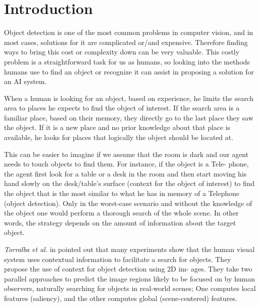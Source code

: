 \chapter{Introduction}
\label{Introduction.ch}
 Object detection is one of the most common problems in computer vision, and in
most cases, solutions for it are complicated or/and expensive. Therefore finding
ways to bring this cost or complexity down can be very valuable. This costly
problem is a straightforward task for us as humans, so looking into the methods
humans use to find an object or recognize it can assist in proposing a solution
for an AI system.
 
When a human is looking for an object, based on experience, he limits the
search area to places he expects to find the object of interest. If the search
area is a familiar place, based on their memory, they directly go to the last place
they saw the object. If it is a new place and no prior knowledge about that place
is available, he looks for places that logically the object should be located at.

This can be easier to imagine if we assume that the room is dark and our
agent needs to touch objects to find them. For instance, if the object is a Tele-
phone, the agent first look for a table or a desk in the room and then start
moving his hand slowly on the desk/table's surface (context for the object of
interest) to find the object that is the most similar to what he has in memory of
a Telephone (object detection). Only in the worst-case scenario and without the
knowledge of the object one would perform a thorough search of the whole
scene. In other words, the strategy depends on the amount of information about
the target object.



{\it Torralba et al.} in \cite{eyeMovement} pointed out that many experiments show
that the human visual system uses contextual information to facilitate a search
for objects. They propose the use of context for object detection using 2D im-
ages. They take two parallel approaches to predict the image regions likely to
be focused on by human observers, naturally searching for objects in real-world
scenes; One computes local features (saliency), and the other computes global
(scene-centered) features.

